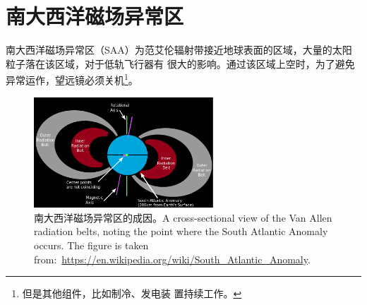 
\section{南大西洋磁场异常区}
南大西洋磁场异常区（SAA）为范艾伦辐射带接近地球表面的区域，大量的太阳粒子落在该区域，对于低轨飞行器有
很大的影响。通过该区域上空时，为了避免异常运作，望远镜必须关机\footnote{但是其他组件，比如制冷、发电装
置持续工作。}。

\begin{figure}
\centering
\includegraphics[width=0.6\textwidth,angle=0]{figs/South_Atlantic_Anomaly.png}
\caption{南大西洋磁场异常区的成因。A cross-sectional view of the Van Allen radiation belts, noting
the point where the South Atlantic Anomaly occurs. The figure is taken
from:~\url{https://en.wikipedia.org/wiki/South_Atlantic_Anomaly}.}
\label{fig:saad1}
\end{figure}

